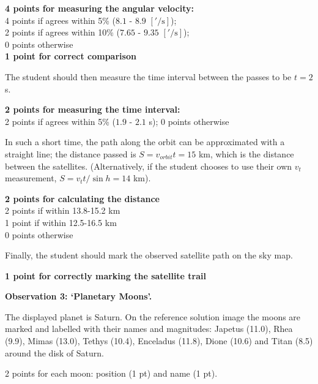 \begin{flushright}
\textbf{4 points for measuring the angular velocity:}\\
4 points if agrees within 5\% ($8.1$ - $8.9$ $['/\mathrm{s}]$);\\
2 points if agrees within 10\% ($7.65$ - $9.35$ $['/\mathrm{s}]$);\\
0 points otherwise\\[4pt]
\textbf{1 point for correct comparison}
\end{flushright}

The student should then measure the time interval between the passes to be
$t = 2$ s.

\begin{flushright}
\textbf{2 points for measuring the time interval:}\\
2 points if agrees within 5\% ($1.9$ - $2.1$ s); 0 points otherwise
\end{flushright}

In such a short time, the path along the orbit can be approximated with a
straight line; the distance passed is $S = v_{orbit}t = 15$ km, which is the
distance between the satellites. (Alternatively, if the student chooses to
use their own $v_t$ measurement, $S = v_t t/\sin h = 14$ km).

\begin{flushright}
\textbf{2 points for calculating the distance}\\
2 points if within 13.8-15.2 km\\
1 point if within 12.5-16.5 km\\
0 points otherwise
\end{flushright}

Finally, the student should mark the observed satellite path on the sky map.

\begin{flushright}
\textbf{1 point for correctly marking the satellite trail}
\end{flushright}

\medskip
\textbf{Observation 3: `Planetary Moons'.}

The displayed planet is Saturn. On the reference solution image the moons
are marked and labelled with their names and magnitudes: Japetus (11.0),
Rhea (9.9), Mimas (13.0), Tethys (10.4), Enceladus (11.8), Dione (10.6) and
Titan (8.5) around the disk of Saturn.


2 points for each moon: position (1 pt) and name (1 pt).

